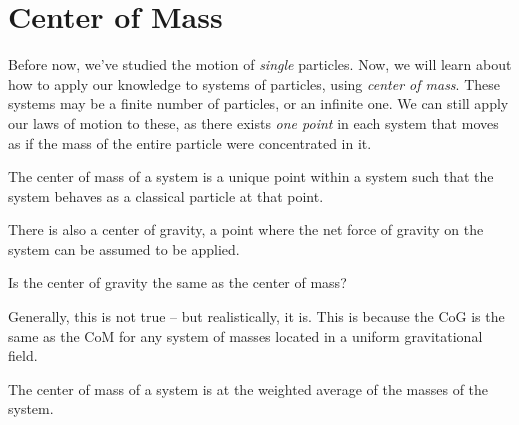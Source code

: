 \documentclass[11pt]{article}
\begin{document}
\section{Center of Mass}
Before now, we've studied the motion of \textit{single} particles. Now, we will learn about how to apply our knowledge to systems of particles, using \textit{center of mass}. These systems may be a finite number of particles, or an infinite one. We can still apply our laws of motion to these, as there exists \textit{one point} in each system that moves as if the mass of the entire particle were concentrated in it.

\begin{defn}
	The center of mass of a system is a unique point within a system such that the system behaves as a classical particle at that point.
\end{defn}
There is also a center of gravity, a point where the net force of gravity on the system can be assumed to be applied.
\begin{question}
	Is the center of gravity the same as the center of mass?
\end{question}
Generally, this is not true -- but realistically, it is. This is because the CoG is the same as the CoM for any system of masses located in a uniform gravitational field.
\begin{law}
	The center of mass of a system is at the weighted average of the masses of the system.
\end{law}
\end{document}
